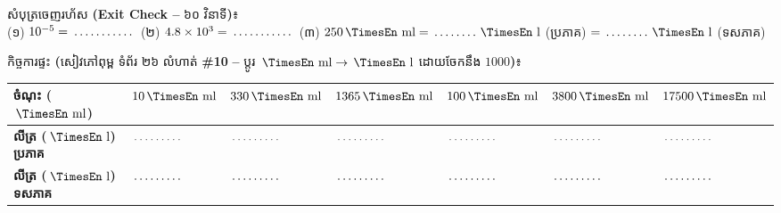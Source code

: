 \documentclass[a4paper,10pt]{article}
\newcommand{\en}[1]{{\TimesEn #1}}
\newcommand{\enbf}[1]{{\TimesEn\bfseries #1}}
\newcommand{\unit}[1]{\,\text{\en{#1}}}
\newcommand{\blank}[1][1.5cm]{\makebox[#1]{\dotfill}}
\begin{document}
\vspace{4pt}
\begin{tcolorbox}[enhanced, sharp corners, colback=white, colframe=black, boxrule=0.85pt, boxsep=2pt, top=3pt, bottom=3pt, left=5pt, right=5pt]
  {\muol\fontsize{8.8pt}{12.5pt}\selectfont សំបុត្រចេញរហ័ស \enbf{(Exit Check --} ៦០ វិនាទី\enbf{)}៖}\\[2pt]
  (១) $10^{-5} = \blank[1.8cm]$ \quad \en{|} \quad
  (២) $4.8 \times 10^3 = \blank[1.8cm]$ \quad \en{|} \quad
  (៣) $250\unit{ml} = \blank[1.3cm]\unit{l}$ (ប្រភាគ) $= \blank[1.3cm]\unit{l}$ (ទសភាគ)
\end{tcolorbox}

\vspace{4pt}
\begin{tcolorbox}[enhanced, sharp corners, colback=panelgray, colframe=black, boxrule=0.85pt, boxsep=2pt, top=3pt, bottom=3pt, left=5pt, right=5pt]
  {\muol\fontsize{8.8pt}{12.5pt}\selectfont កិច្ចការផ្ទះ \enbf{(}សៀវភៅពុម្ព ទំព័រ ២៦ លំហាត់ \enbf{\#10} \enbf{--} ប្ដូរ $\unit{ml}\to\unit{l}$ ដោយចែកនឹង $1000$\enbf{)}៖}\\[3pt]
  {\renewcommand{\arraystretch}{1.32}\footnotesize
  \begin{tabular}{|L{3.50cm}|C{2.15cm}|C{2.15cm}|C{2.25cm}|C{2.15cm}|C{2.25cm}|C{2.35cm}|}
    \hline
    \textbf{ចំណុះ ($\unit{ml}$)} & $10\unit{ml}$ & $330\unit{ml}$ & $1365\unit{ml}$ & $100\unit{ml}$ & $3800\unit{ml}$ & $17500\unit{ml}$ \\
    \hline
    \textbf{លីត្រ ($\unit{l}$) ប្រភាគ} & $\blank[1.4cm]$ & $\blank[1.4cm]$ & $\blank[1.4cm]$ & $\blank[1.4cm]$ & $\blank[1.4cm]$ & $\blank[1.4cm]$ \\
    \hline
    \textbf{លីត្រ ($\unit{l}$) ទសភាគ} & $\blank[1.4cm]$ & $\blank[1.4cm]$ & $\blank[1.4cm]$ & $\blank[1.4cm]$ & $\blank[1.4cm]$ & $\blank[1.4cm]$ \\
    \hline
  \end{tabular}}
\end{tcolorbox}
\end{document}
